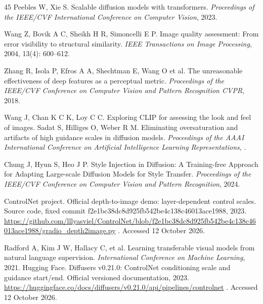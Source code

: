 \documentclass[times,twocolumn,final]{elsarticle}
\providecommand{\DIFadd}[1]{{\protect\color{blue} \sf #1}} %
\providecommand{\DIFdel}[1]{{\protect\color{red} \scriptsize #1}} %
\providecommand{\DIFaddbegin}{} %
\providecommand{\DIFaddend}{} %
\providecommand{\DIFdelbegin}{} %
\providecommand{\DIFdelend}{} %
\begin{document}
\begin{thebibliography}{45}
\DIFdel{Peebles W, Xie S. Scalable diffusion models with transformers. \textit{Proceedings of the IEEE/CVF International Conference on Computer Vision}, 2023.
}%

\DIFdelend {}
Wang Z, Bovik A C, Sheikh H R, Simoncelli E P. Image quality assessment: From error visibility to structural similarity. \textit{IEEE Transactions on Image Processing}, 2004, 13(4): 600--612.

Zhang R, Isola P, Efros A A, \DIFdelbegin \DIFdel{Shechtman E, Wang O}\DIFdelend \DIFaddbegin \DIFadd{et al}\DIFaddend . The unreasonable effectiveness of deep features as a perceptual metric. \textit{\DIFdelbegin \DIFdel{Proceedings of the IEEE/CVF Conference on Computer Vision and Pattern Recognition}\DIFdelend \DIFaddbegin \DIFadd{CVPR}\DIFaddend }, 2018.

\DIFdelbegin %
\DIFdel{Wang J, Chan K C K, Loy C C. Exploring CLIP for assessing the look and feel of images. }\DIFdelend \DIFaddbegin {}
\DIFadd{Sadat S, Hilliges O, Weber R M. Eliminating oversaturation and artifacts of high guidance scales in diffusion models. }\DIFaddend \textit{\DIFdelbegin \DIFdel{Proceedings of the AAAI }\DIFdelend \DIFaddbegin \DIFadd{International }\DIFaddend Conference on \DIFdelbegin \DIFdel{Artificial Intelligence}\DIFdelend \DIFaddbegin \DIFadd{Learning Representations}\DIFaddend }, \DIFaddbegin \DIFadd{2025.
}

\DIFadd{Chung J, Hyun S, Heo J P. Style Injection in Diffusion: A Training-free Approach for Adapting Large-scale Diffusion Models for Style Transfer. \textit{Proceedings of the IEEE/CVF Conference on Computer Vision and Pattern Recognition}, 2024.
}

\DIFadd{ControlNet project. Official depth-to-image demo: layer-dependent control scales. Source code, fixed commit f2e1bc38dc8d925fb542be4c138c46013ace1988, }\DIFaddend 2023. \DIFaddbegin \url{https://github.com/lllyasviel/ControlNet/blob/f2e1bc38dc8d925fb542be4c138c46013ace1988/gradio_depth2image.py}\DIFadd{. Accessed 12 October 2026.
}\DIFaddend

\DIFdelbegin %
\DIFdel{Radford A, Kim J W, Hallacy C, et al. Learning transferable visual models from natural language supervision. \textit{International Conference on Machine Learning}, 2021.
}\DIFdelend \DIFaddbegin {}
\DIFadd{Hugging Face. Diffusers v0.21.0: ControlNet conditioning scale and guidance start/end. Official versioned documentation, 2023. }\url{https://huggingface.co/docs/diffusers/v0.21.0/api/pipelines/controlnet}\DIFadd{. Accessed 12 October 2026.
}\DIFaddend

\end{thebibliography}
\DIFaddbegin \endgroup
 \DIFaddend
\end{document}
